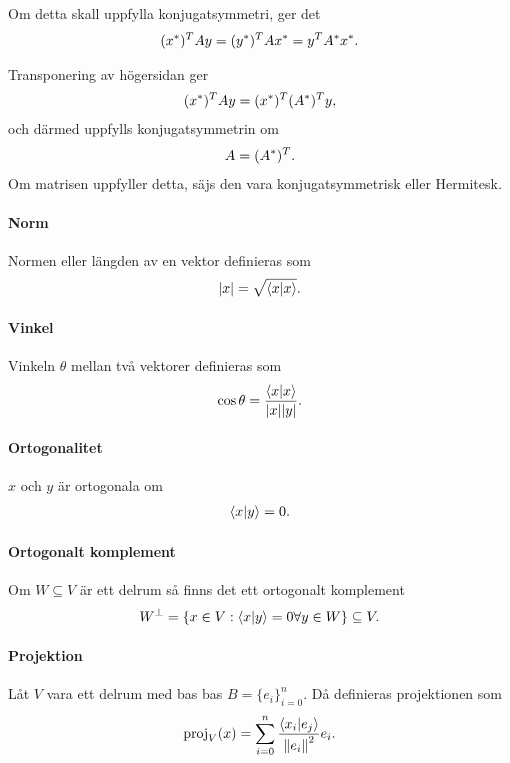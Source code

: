 Om detta skall uppfylla konjugatsymmetri, ger det
\begin{align*}
	(x^{*})^{T}Ay = (y^{*})^{T}Ax^{*} = y^{T}A^{*}x^{*}.
\end{align*}

Transponering av högersidan ger
\begin{align*}
	(x^{*})^{T}Ay = (x^{*})^{T}(A^{*})^{T}y,
\end{align*}
och därmed uppfylls konjugatsymmetrin om
\begin{align*}
	A = (A^{*})^{T}.
\end{align*}
Om matrisen uppfyller detta, säjs den vara konjugatsymmetrisk eller Hermitesk.

\paragraph{Norm}
Normen eller längden av en vektor definieras som
\begin{align*}
	\abs{x} = \sqrt{\bra{x}\ket{x}}.
\end{align*}

\paragraph{Vinkel}
Vinkeln $\theta$ mellan två vektorer definieras som
\begin{align*}
	\cos{\theta} = \frac{\bra{x}\ket{x}}{\abs{x}\abs{y}}.
\end{align*}

\paragraph{Ortogonalitet}
$x$ och $y$ är ortogonala om
\begin{align*}
	\bra{x}\ket{y} = 0.
\end{align*}

\paragraph{Ortogonalt komplement}
Om $W\subseteq V$ är ett delrum så finns det ett ortogonalt komplement
\begin{align*}
	W^{\perp} = \left\{x\in V: \bra{x}\ket{y} = 0\forall y\in W\right\} \subseteq V.
\end{align*}

\paragraph{Projektion}
Låt $V$ vara ett delrum med bas bas $B = \{e_{i}\}_{i= 0}^{n}$. Då definieras projektionen som
\begin{align*}
	\text{proj}_{V}(x) = \sum\limits_{i = 0}^{n}\frac{\bra{x_{i}}\ket{e_{j}}}{\norm{e_{i}}^{2}}e_{i}.
\end{align*}


